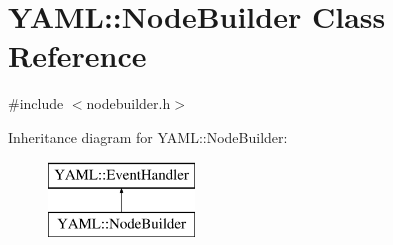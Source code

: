 \hypertarget{class_y_a_m_l_1_1_node_builder}{}\section{Y\+A\+ML\+::Node\+Builder Class Reference}
\label{class_y_a_m_l_1_1_node_builder}


{\ttfamily \#include $<$nodebuilder.\+h$>$}

Inheritance diagram for Y\+A\+ML\+::Node\+Builder\+:\begin{figure}[H]
\begin{center}
\leavevmode
\includegraphics[height=2.000000cm]{class_y_a_m_l_1_1_node_builder}
\end{center}
\end{figure}
